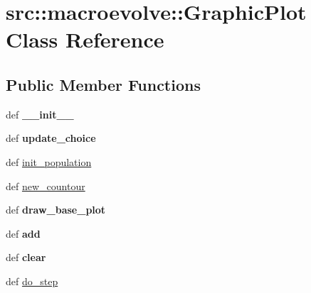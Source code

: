 \hypertarget{classsrc_1_1macroevolve_1_1GraphicPlot}{
\section{src::macroevolve::GraphicPlot Class Reference}
\label{classsrc_1_1macroevolve_1_1GraphicPlot}
}
\subsection*{Public Member Functions}
\begin{DoxyCompactItemize}
\item 
\hypertarget{classsrc_1_1macroevolve_1_1GraphicPlot_a8a0d351163202ae89a91f45866c3e931}{
def {\bfseries \_\-\_\-init\_\-\_\-}}
\label{classsrc_1_1macroevolve_1_1GraphicPlot_a8a0d351163202ae89a91f45866c3e931}

\item 
\hypertarget{classsrc_1_1macroevolve_1_1GraphicPlot_aa0e38b09f0fe73419b95c1cd4bb6e473}{
def {\bfseries update\_\-choice}}
\label{classsrc_1_1macroevolve_1_1GraphicPlot_aa0e38b09f0fe73419b95c1cd4bb6e473}

\item 
def \hyperlink{classsrc_1_1macroevolve_1_1GraphicPlot_a4ea1a97b9365dc493aac5b33ec47f435}{init\_\-population}
\item 
def \hyperlink{classsrc_1_1macroevolve_1_1GraphicPlot_a8880d0eb01075aeee69f7ee7d37f00e5}{new\_\-countour}
\item 
\hypertarget{classsrc_1_1macroevolve_1_1GraphicPlot_a69a98bd9ca4e7c1c119d69e562e55766}{
def {\bfseries draw\_\-base\_\-plot}}
\label{classsrc_1_1macroevolve_1_1GraphicPlot_a69a98bd9ca4e7c1c119d69e562e55766}

\item 
\hypertarget{classsrc_1_1macroevolve_1_1GraphicPlot_ace8ebb8e28ff483deff3420410911360}{
def {\bfseries add}}
\label{classsrc_1_1macroevolve_1_1GraphicPlot_ace8ebb8e28ff483deff3420410911360}

\item 
\hypertarget{classsrc_1_1macroevolve_1_1GraphicPlot_aee60c9eda48d0c243746b7adaae3f3d1}{
def {\bfseries clear}}
\label{classsrc_1_1macroevolve_1_1GraphicPlot_aee60c9eda48d0c243746b7adaae3f3d1}

\item 
def \hyperlink{classsrc_1_1macroevolve_1_1GraphicPlot_a853a1491fb87914370d2ddf523d28d2c}{do\_\-step}
\end{DoxyCompactItemize}
